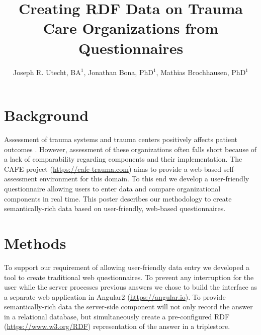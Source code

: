 \documentclass{amia}
\begin{document}
\title{Creating RDF Data on Trauma Care Organizations from Questionnaires}

\author{Joseph R. Utecht, BA$^{1}$, Jonathan Bona, PhD$^{1}$, Mathias Brochhausen, PhD$^{1}$}


\maketitle

\section*{Background}

Assessment of trauma systems and trauma centers positively affects patient outcomes \cite{ref1, ref2}.
However, assessment of these organizations often falls short because of a lack of comparability regarding components and their implementation.
The CAFE project (\href{https://cafe-trauma.com}{https://cafe-trauma.com}) aims to provide a web-based self-assessment environment for this domain.
To this end we develop a user-friendly questionnaire allowing users to enter data and compare organizational components in real time.
This poster describes our methodology to create semantically-rich data based on user-friendly, web-based questionnaires.


\section*{Methods}
To support our requirement of allowing user-friendly data entry we developed a tool to create traditional web questionnaires.
To prevent any interruption for the user while the server processes previous answers we chose to build the interface as a separate web application in Angular2 (\href{https://angular.io}{https://angular.io}).
To provide semantically-rich data the server-side component will not only record the answer in a relational database, but simultaneously create a pre-configured RDF (\href{https://www.w3.org/RDF}{https://www.w3.org/RDF}) representation of the answer in a triplestore.
\end{document}
